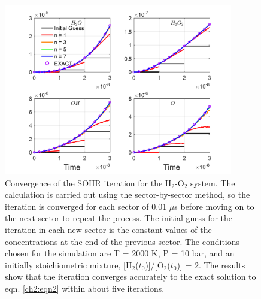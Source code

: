 \begin{figure}[htbp]
	\caption[Convergence of the SOHR iteration for the H$_2$-O$_2$ system]
	{Convergence of the SOHR iteration for the H$_2$-O$_2$ system.
The calculation is carried out using the sector-by-sector method, so the
iteration is converged for each sector of 0.01 $\mu$s before moving on to
the next sector to repeat the process. The initial guess for the iteration
in each new sector is the constant values of the concentrations at the
end of the previous sector. The conditions chosen for the simulation
are T = 2000 K, P = 10 bar, and an initially stoichiometric mixture,
[H$_2$($t_0$)]/[O$_2$($t_0$)] = 2. The results show that the iteration converges
accurately to the exact solution to eqn. \ref{ch2:eqn2} within about five iterations.}
    \begin{center}
	\includegraphics[width=100mm]{figs/chapter4/fig5.png}
    \end{center}
\label{ch4:fig:5}
\end{figure}
